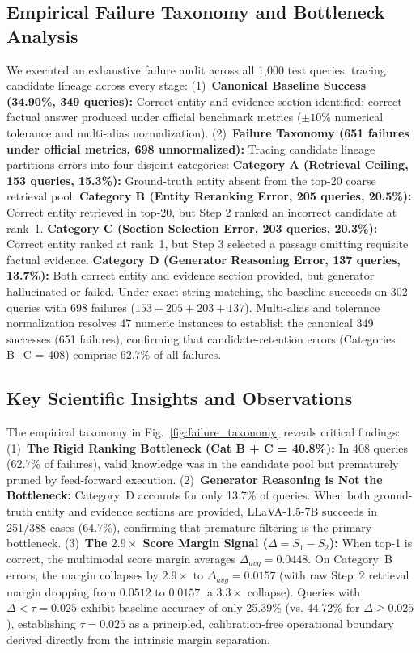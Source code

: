 \documentclass[conference]{IEEEtran}
\begin{document}
\subsection{Empirical Failure Taxonomy and Bottleneck Analysis}
We executed an exhaustive failure audit across all 1,000 test queries, tracing candidate lineage across every stage:
(1)~\textbf{Canonical Baseline Success (34.90\%, 349 queries):} Correct entity and evidence section identified; correct factual answer produced under official benchmark metrics ($\pm 10\%$ numerical tolerance and multi-alias normalization).
(2)~\textbf{Failure Taxonomy (651 failures under official metrics, 698 unnormalized):} Tracing candidate lineage partitions errors into four disjoint categories:
\textbf{Category A (Retrieval Ceiling, 153 queries, 15.3\%):} Ground-truth entity absent from the top-20 coarse retrieval pool.
\textbf{Category B (Entity Reranking Error, 205 queries, 20.5\%):} Correct entity retrieved in top-20, but Step 2 ranked an incorrect candidate at rank~1.
\textbf{Category C (Section Selection Error, 203 queries, 20.3\%):} Correct entity ranked at rank~1, but Step 3 selected a passage omitting requisite factual evidence.
\textbf{Category D (Generator Reasoning Error, 137 queries, 13.7\%):} Both correct entity and evidence section provided, but generator hallucinated or failed.
Under exact string matching, the baseline succeeds on 302 queries with 698 failures ($153+205+203+137$). Multi-alias and tolerance normalization resolves 47 numeric instances to establish the canonical 349 successes (651 failures), confirming that candidate-retention errors (Categories B+C = 408) comprise 62.7\% of all failures.

\subsection{Key Scientific Insights and Observations}
The empirical taxonomy in Fig.~\ref{fig:failure_taxonomy} reveals critical findings:
(1)~\textbf{The Rigid Ranking Bottleneck (Cat B + C = 40.8\%):} In 408 queries (62.7\% of failures), valid knowledge was in the candidate pool but prematurely pruned by feed-forward execution.
(2)~\textbf{Generator Reasoning is Not the Bottleneck:} Category~D accounts for only 13.7\% of queries. When both ground-truth entity and evidence sections are provided, LLaVA-1.5-7B succeeds in 251/388 cases (64.7\%), confirming that premature filtering is the primary bottleneck.
(3)~\textbf{The $2.9\times$ Score Margin Signal ($\Delta = S_1 - S_2$):} When top-1 is correct, the multimodal score margin averages $\Delta_{avg} = 0.0448$. On Category~B errors, the margin collapses by $2.9\times$ to $\Delta_{avg} = 0.0157$ (with raw Step~2 retrieval margin dropping from $0.0512$ to $0.0157$, a $3.3\times$ collapse). Queries with $\Delta < \tau = 0.025$ exhibit baseline accuracy of only 25.39\% (vs. 44.72\% for $\Delta \ge 0.025$), establishing $\tau = 0.025$ as a principled, calibration-free operational boundary derived directly from the intrinsic margin separation.
\end{document}

